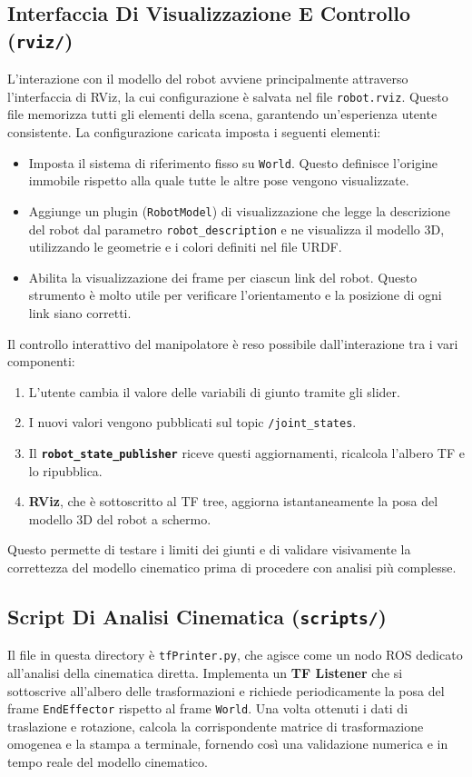 \documentclass[11pt, a4paper]{report}
\begin{document}
\subsection{Interfaccia Di Visualizzazione E Controllo (\texttt{rviz/})}
\label{subsec:configurazione_rviz}
L'interazione con il modello del robot avviene principalmente attraverso l'interfaccia di RViz, la cui configurazione è salvata nel file \texttt{robot.rviz}. Questo file memorizza tutti gli elementi della scena, garantendo un'esperienza utente consistente. La configurazione caricata imposta i seguenti elementi:
\begin{itemize}
    \item Imposta il sistema di riferimento fisso su \texttt{World}. Questo definisce l'origine immobile rispetto alla quale tutte le altre pose vengono visualizzate.
    \item Aggiunge un plugin (\texttt{RobotModel}) di visualizzazione che legge la descrizione del robot dal parametro \texttt{robot\_description} e ne visualizza il modello 3D, utilizzando le geometrie e i colori definiti nel file URDF.
    \item Abilita la visualizzazione dei frame per ciascun link del robot. Questo strumento è molto utile per verificare l'orientamento e la posizione di ogni link siano corretti.
\end{itemize}

Il controllo interattivo del manipolatore è reso possibile dall'interazione tra i vari componenti:
\begin{enumerate}
    \item L'utente cambia il valore delle variabili di giunto tramite gli slider.
    \item I nuovi valori vengono pubblicati sul topic \texttt{/joint\_states}.
    \item Il \textbf{\texttt{robot\_state\_publisher}} riceve questi aggiornamenti, ricalcola l'albero TF e lo ripubblica.
    \item \textbf{RViz}, che è sottoscritto al TF tree, aggiorna istantaneamente la posa del modello 3D del robot a schermo.
\end{enumerate}
Questo permette di testare i limiti dei giunti e di validare visivamente la correttezza del modello cinematico prima di procedere con analisi più complesse.

\subsection{Script Di Analisi Cinematica (\texttt{scripts/})}
\label{subsec:scripts}
Il file in questa directory è \texttt{tfPrinter.py}, che agisce come un nodo ROS dedicato all'analisi della cinematica diretta. Implementa un \textbf{TF Listener} che si sottoscrive all'albero delle trasformazioni e richiede periodicamente la posa del frame \texttt{EndEffector} rispetto al frame \texttt{World}. Una volta ottenuti i dati di traslazione e rotazione, calcola la corrispondente matrice di trasformazione omogenea e la stampa a terminale, fornendo così una validazione numerica e in tempo reale del modello cinematico.
\end{document}
